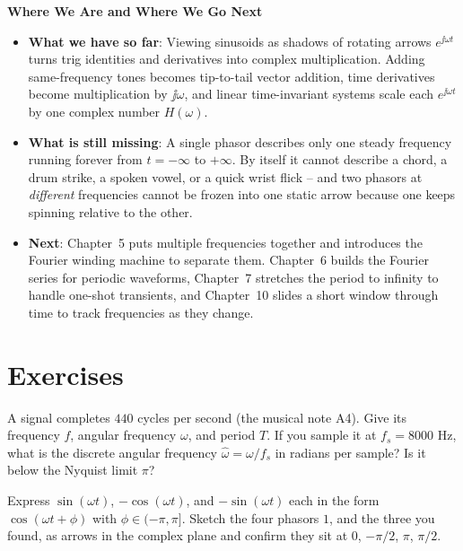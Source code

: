 \begin{connectionbox}
\textbf{Where We Are and Where We Go Next}
\begin{itemize}
  \item \textbf{What we have so far}: Viewing sinusoids as shadows of rotating arrows $e^{\jj\omega t}$
  turns trig identities and derivatives into complex multiplication. Adding same-frequency tones
  becomes tip-to-tail vector addition, time derivatives become multiplication by $\jj\omega$, and
  linear time-invariant systems scale each $e^{\jj\omega t}$ by one complex number $H(\omega)$.
  \item \textbf{What is still missing}: A single phasor describes only one steady frequency running
  forever from $t = -\infty$ to $+\infty$. By itself it cannot describe a chord, a drum strike, a
  spoken vowel, or a quick wrist flick -- and two phasors at \emph{different} frequencies cannot be
  frozen into one static arrow because one keeps spinning relative to the other.
  \item \textbf{Next}: Chapter~5 puts multiple frequencies together and introduces the Fourier
  winding machine to separate them. Chapter~6 builds the Fourier series for periodic waveforms,
  Chapter~7 stretches the period to infinity to handle one-shot transients, and Chapter~10 slides a
  short window through time to track frequencies as they change.
\end{itemize}
\end{connectionbox}

\section{Exercises}
\label{ch04:exercises}

\begin{exercise}
A signal completes $440$ cycles per second (the musical note A4). Give its frequency $f$, angular
frequency $\omega$, and period $T$. If you sample it at $f_s = 8000$ Hz, what is the discrete
angular frequency $\hat\omega = \omega/f_s$ in radians per sample? Is it below the Nyquist limit
$\pi$?
\end{exercise}

\begin{exercise}
Express $\sin(\omega t)$, $-\cos(\omega t)$, and $-\sin(\omega t)$ each in the form
$\cos(\omega t + \phi)$ with $\phi \in (-\pi, \pi]$. Sketch the four phasors $1$, and the three you
found, as arrows in the complex plane and confirm they sit at $0$, $-\pi/2$, $\pi$, $\pi/2$.
\end{exercise}

